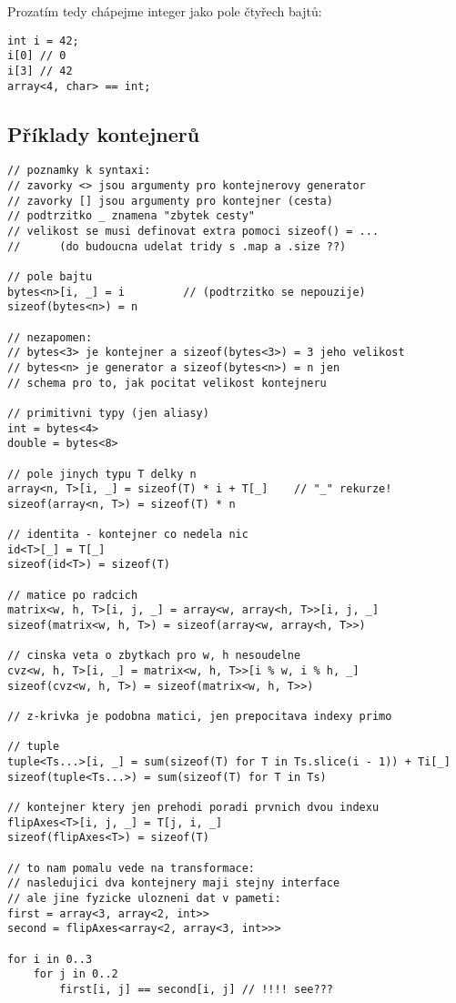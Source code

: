 \documentclass[a4paper,12pt]{article}
\begin{document}
Prozatím tedy chápejme integer jako pole čtyřech bajtů:

\begin{lstlisting}
int i = 42;
i[0] // 0
i[3] // 42
array<4, char> == int;
\end{lstlisting}

\subsection{Příklady kontejnerů}

\begin{lstlisting}
// poznamky k syntaxi:
// zavorky <> jsou argumenty pro kontejnerovy generator
// zavorky [] jsou argumenty pro kontejner (cesta)
// podtrzitko _ znamena "zbytek cesty"
// velikost se musi definovat extra pomoci sizeof() = ...
//      (do budoucna udelat tridy s .map a .size ??)

// pole bajtu
bytes<n>[i, _] = i         // (podtrzitko se nepouzije)
sizeof(bytes<n>) = n

// nezapomen:
// bytes<3> je kontejner a sizeof(bytes<3>) = 3 jeho velikost
// bytes<n> je generator a sizeof(bytes<n>) = n jen
// schema pro to, jak pocitat velikost kontejneru

// primitivni typy (jen aliasy)
int = bytes<4>
double = bytes<8>

// pole jinych typu T delky n
array<n, T>[i, _] = sizeof(T) * i + T[_]    // "_" rekurze!
sizeof(array<n, T>) = sizeof(T) * n

// identita - kontejner co nedela nic
id<T>[_] = T[_]
sizeof(id<T>) = sizeof(T)

// matice po radcich
matrix<w, h, T>[i, j, _] = array<w, array<h, T>>[i, j, _]
sizeof(matrix<w, h, T>) = sizeof(array<w, array<h, T>>)

// cinska veta o zbytkach pro w, h nesoudelne
cvz<w, h, T>[i, _] = matrix<w, h, T>>[i % w, i % h, _]
sizeof(cvz<w, h, T>) = sizeof(matrix<w, h, T>>)

// z-krivka je podobna matici, jen prepocitava indexy primo

// tuple
tuple<Ts...>[i, _] = sum(sizeof(T) for T in Ts.slice(i - 1)) + Ti[_]
sizeof(tuple<Ts...>) = sum(sizeof(T) for T in Ts)

// kontejner ktery jen prehodi poradi prvnich dvou indexu
flipAxes<T>[i, j, _] = T[j, i, _]
sizeof(flipAxes<T>) = sizeof(T)

// to nam pomalu vede na transformace:
// nasledujici dva kontejnery maji stejny interface
// ale jine fyzicke ulozneni dat v pameti:
first = array<3, array<2, int>>
second = flipAxes<array<2, array<3, int>>>

for i in 0..3
    for j in 0..2
        first[i, j] == second[i, j] // !!!! see???
\end{lstlisting}
\end{document}
